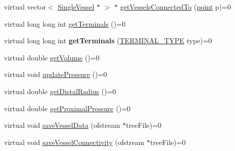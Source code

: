 \begin{DoxyCompactItemize}
\item 
virtual vector$<$ \hyperlink{class_single_vessel}{Single\+Vessel} $\ast$ $>$ $\ast$ \hyperlink{class_abstract_vascular_element_a7720067153a223d373c26e14155553e3}{get\+Vessels\+Connected\+To} (\hyperlink{structpoint}{point} p)=0
\item 
virtual long long int \hyperlink{class_abstract_vascular_element_a85d8d19d6f92a4e7cc95cc0f8f5a59c9}{get\+Terminals} ()=0
\item 
virtual long long int {\bfseries get\+Terminals} (\hyperlink{class_abstract_vascular_element_a9c7d6ae9fe8c220ddad143208b0a5a11}{T\+E\+R\+M\+I\+N\+A\+L\+\_\+\+T\+Y\+PE} type)=0\hypertarget{class_abstract_vascular_element_a78601a0007b77be084b381834a9e20e4}{}\label{class_abstract_vascular_element_a78601a0007b77be084b381834a9e20e4}

\item 
virtual double \hyperlink{class_abstract_vascular_element_ae4ecb632a94e89ac21f6523637bdb9cd}{get\+Volume} ()=0
\item 
virtual void \hyperlink{class_abstract_vascular_element_a258a830359614d0217e820293a9bdaa9}{update\+Pressure} ()=0
\item 
virtual double \hyperlink{class_abstract_vascular_element_a3880bed8d0a9223107bcee195bb89e51}{get\+Distal\+Radius} ()=0
\item 
virtual double \hyperlink{class_abstract_vascular_element_aa486370af563a9ea9bfcdcde8ee38426}{get\+Proximal\+Pressure} ()=0
\item 
virtual void \hyperlink{class_abstract_vascular_element_aff5f129b31f0c82aebf2d7387859914d}{save\+Vessel\+Data} (ofstream $\ast$tree\+File)=0
\item 
virtual void \hyperlink{class_abstract_vascular_element_a878c2826beb1a549c28659182760fbab}{save\+Vessel\+Connectivity} (ofstream $\ast$tree\+File)=0
\end{DoxyCompactItemize}
